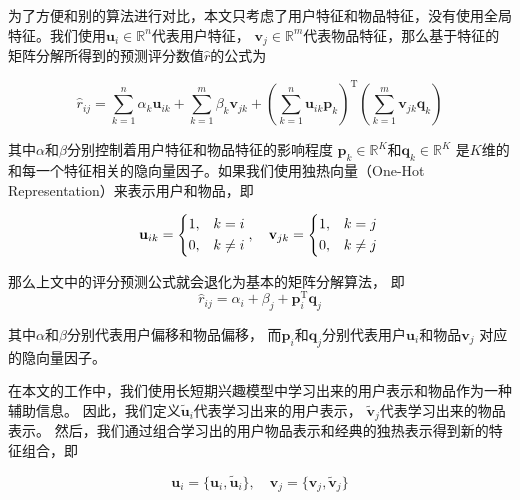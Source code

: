 为了方便和别的算法进行对比，本文只考虑了用户特征和物品特征，没有使用全局特征。我们使用$\mathbf{u}_i \in \mathbb{R}^{n}$代表用户特征，
$\mathbf{v}_j \in \mathbb{R}^{m}$代表物品特征，那么基于特征的矩阵分解所得到的预测评分数值$\hat{r}$的公式为

\begin{equation}
\hat{r}_{ij} = \sum_{k=1}^{n} \alpha_k \mathbf{u}_{ik} + \sum_{k=1}^{m} \beta_k \mathbf{v}_{jk} +
\left( \sum_{k=1}^{n} \mathbf{u}_{ik} \mathbf{p}_k \right) ^ \mathrm{T}
\left( \sum_{k=1}^{m} \mathbf{v}_{jk} \mathbf{q}_k \right)
\end{equation}

其中$\alpha$和$\beta$分别控制着用户特征和物品特征的影响程度
$\mathbf{p}_{k} \in \mathbb{R}^K$和$\mathbf{q}_{k} \in \mathbb{R}^K$
是$K$维的和每一个特征相关的隐向量因子。如果我们使用独热向量（One-Hot Representation）来表示用户和物品，即

\begin{equation}
\mathbf{u}_{ik} =
\left\{
\begin{aligned}
1, &\quad k = i \\
0, &\quad k \not= i
\end{aligned}
\right. \\ , \quad
\mathbf{v}_{jk} =
\left\{
\begin{aligned}
1, &\quad k = j \\
0, &\quad k \not= j
\end{aligned}
\right. \\
\end{equation}

那么上文中的评分预测公式就会退化为基本的矩阵分解算法，
即
\begin{equation}
\hat{r}_{ij} = \alpha_i + \beta_j + \mathbf{p}_i ^ \mathrm{T} \mathbf{q}_j
\end{equation}

其中$\alpha$和$\beta$分别代表用户偏移和物品偏移，
而$\mathbf{p}_i$和$\mathbf{q}_j$分别代表用户$\mathbf{u}_i$和物品$\mathbf{v}_j$
对应的隐向量因子。

在本文的工作中，我们使用长短期兴趣模型中学习出来的用户表示和物品作为一种辅助信息。
因此，我们定义$\tilde{\mathbf{u}}_i$代表学习出来的用户表示，
$\tilde{\mathbf{v}}_j$代表学习出来的物品表示。
然后，我们通过组合学习出的用户物品表示和经典的独热表示得到新的特征组合，即

\begin{equation}
\mathbf{u}_{i} = \{ \mathbf{u}_{i} , \tilde{\mathbf{u}}_i \} , \quad
\mathbf{v}_{j} = \{ \mathbf{v}_{j} , \tilde{\mathbf{v}}_j \}
\end{equation}

